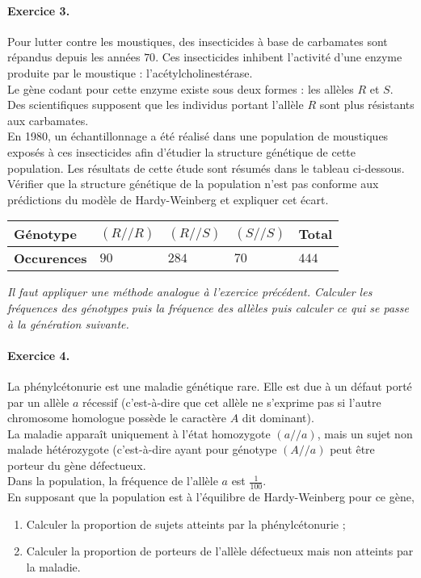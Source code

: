 \documentclass[11pt]{article}
\begin{document}
\paragraph{Exercice 3.}
Pour lutter contre les moustiques, des insecticides à base de carbamates sont répandus depuis les années $70$. Ces insecticides inhibent l'activité d'une enzyme produite par le moustique : l'acétylcholinestérase. \\
Le gène codant pour cette enzyme existe sous deux formes : les allèles $R$ et $S$. Des scientifiques supposent que les individus portant l'allèle $R$ sont plus résistants aux carbamates. \\
En 1980, un échantillonnage a été réalisé dans une population de moustiques exposés à ces insecticides afin d'étudier la structure génétique de cette population.
Les résultats de cette étude sont résumés dans le tableau ci-dessous. \\
Vérifier que la structure génétique de la population n'est pas conforme aux prédictions du modèle de Hardy-Weinberg et expliquer cet écart.
\begin{center}
	\renewcommand{\arraystretch}{2}
	\begin{tabular}{|>{\centering\arraybackslash}m{2cm}|>{\centering\arraybackslash}m{1.5cm}|>{\centering\arraybackslash}m{1.5cm}|>{\centering\arraybackslash}m{1.5cm}|>{\centering\arraybackslash}m{1.5cm}|}
		\hline
		\textbf{Génotype}&$(R//R)$&$(R//S)$&$(S//S)$&Total\\
		\hline
		\textbf{Occurences}  &$90$&$284$&$70$&$444$\\
		\hline
	\end{tabular}
\end{center}
\textit{Il faut appliquer une méthode analogue à l'exercice précédent. Calculer les fréquences des génotypes puis la fréquence des allèles puis calculer ce qui se passe à la génération suivante.  }

\paragraph{Exercice 4.}
La phénylcétonurie est une maladie génétique rare. Elle est due à un défaut
porté par un allèle $a$ récessif (c’est-à-dire que cet allèle ne s’exprime pas si l’autre chromosome homologue possède le caractère $A$ dit dominant). \\
La maladie apparaît uniquement à l’état homozygote $(a//a)$, mais un sujet non malade hétérozygote (c’est-à-dire ayant pour génotype $(A//a)$ peut être porteur du gène défectueux.\\
Dans la population, la fréquence de l’allèle $a$ est $\frac{1}{100}$.\\ En supposant que la population est à l’équilibre de Hardy-Weinberg pour ce gène,
\begin{enumerate}%
	\item Calculer la proportion de sujets atteints par la phénylcétonurie ;
	\item Calculer la proportion de porteurs de l’allèle défectueux mais non atteints par la maladie.
\end{enumerate}
\end{document}
